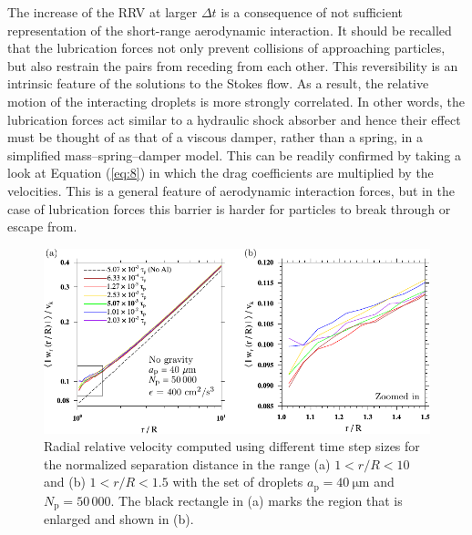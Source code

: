 \documentclass[../thesis.tex]{subfiles}
\begin{document}
The increase of the RRV at larger $\Delta t$ is a consequence of not sufficient representation of the short-range aerodynamic interaction. It should be recalled that the lubrication forces not only prevent collisions of approaching particles, but also restrain the pairs from receding from each other. This reversibility is an intrinsic feature of the solutions to the Stokes flow. As a result, the relative motion of the interacting droplets is more strongly correlated. In other words, the lubrication forces act similar to a hydraulic shock absorber and hence their effect must be thought of as that of a viscous damper, rather than a spring, in a simplified mass--spring--damper model. This can be readily confirmed by taking a look at Equation (\ref{eq:8}) in which the drag coefficients are multiplied by the velocities. This is a general feature of aerodynamic interaction forces, but in the case of lubrication forces this barrier is harder for particles to break through or escape from.

\begin{figure}%
\center
\includegraphics[width=\textwidth]{../figs/JFM/fig3.pdf}
\caption{Radial relative velocity computed using different time step sizes
for the normalized separation distance in the range (a) $1 < r/R < 10$ and (b) $1 < r/R < 1.5$
 with the set of droplets $a_\mathrm{p} = 40~\mathrm{\mu m}$ and $N_\mathrm{p} = 50\,000$.
The black rectangle in (a) marks the region that is enlarged and shown in (b).}
\label{Fig3}
\end{figure}%
\end{document}
